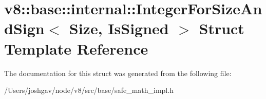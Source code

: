 \hypertarget{structv8_1_1base_1_1internal_1_1_integer_for_size_and_sign}{}\section{v8\+:\+:base\+:\+:internal\+:\+:Integer\+For\+Size\+And\+Sign$<$ Size, Is\+Signed $>$ Struct Template Reference}
\label{structv8_1_1base_1_1internal_1_1_integer_for_size_and_sign}


The documentation for this struct was generated from the following file\+:\begin{DoxyCompactItemize}
\item 
/\+Users/joshgav/node/v8/src/base/safe\+\_\+math\+\_\+impl.\+h\end{DoxyCompactItemize}

